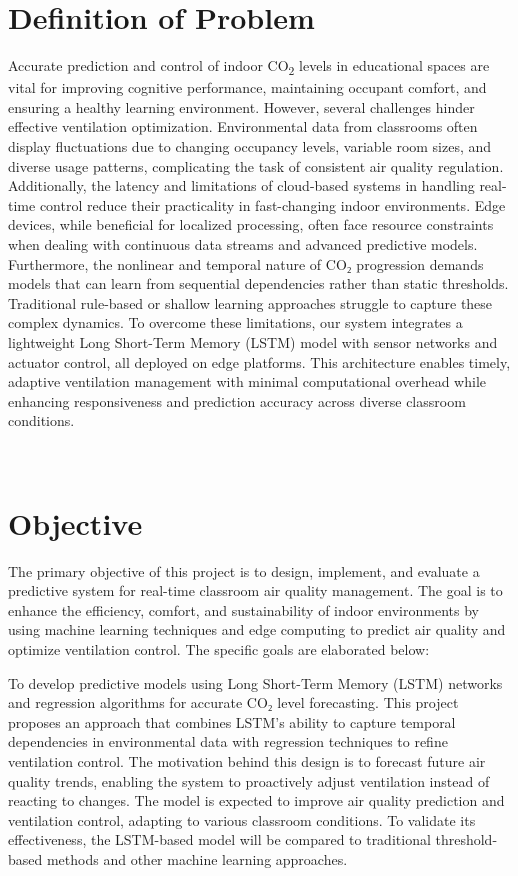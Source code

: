 \section{Definition of Problem}
Accurate prediction and control of indoor CO\textsubscript{2}   levels in educational spaces are vital for improving cognitive performance, maintaining occupant comfort, and ensuring a healthy learning environment. However, several challenges hinder effective ventilation optimization. Environmental data from classrooms often display fluctuations due to changing occupancy levels, variable room sizes, and diverse usage patterns, complicating the task of consistent air quality regulation. Additionally, the latency and limitations of cloud-based systems in handling real-time control reduce their practicality in fast-changing indoor environments. Edge devices, while beneficial for localized processing, often face resource constraints when dealing with continuous data streams and advanced predictive models. Furthermore, the nonlinear and temporal nature of CO₂ progression demands models that can learn from sequential dependencies rather than static thresholds. Traditional rule-based or shallow learning approaches struggle to capture these complex dynamics. To overcome these limitations, our system integrates a lightweight Long Short-Term Memory (LSTM) model with sensor networks and actuator control, all deployed on edge platforms. This architecture enables timely, adaptive ventilation management with minimal computational overhead while enhancing responsiveness and prediction accuracy across diverse classroom conditions.

\\ 

\section{Objective}
The primary objective of this project is to design, implement, and evaluate a predictive system for real-time classroom air quality management. The goal is to enhance the efficiency, comfort, and sustainability of indoor environments by using machine learning techniques and edge computing to predict air quality and optimize ventilation control. The specific goals are elaborated below:

To develop predictive models using Long Short-Term Memory (LSTM) networks and regression algorithms for accurate CO₂ level forecasting. This project proposes an approach that combines LSTM's ability to capture temporal dependencies in environmental data with regression techniques to refine ventilation control. The motivation behind this design is to forecast future air quality trends, enabling the system to proactively adjust ventilation instead of reacting to changes. The model is expected to improve air quality prediction and ventilation control, adapting to various classroom conditions. To validate its effectiveness, the LSTM-based model will be compared to traditional threshold-based methods and other machine learning approaches.

